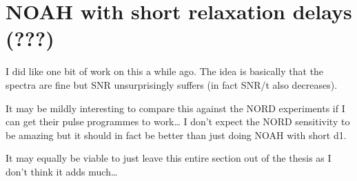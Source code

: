 \section{NOAH with short relaxation delays (???)}
\label{sec:noah__shortd1}

I did like one bit of work on this a while ago.
The idea is basically that the spectra are fine but SNR unsurprisingly suffers (in fact SNR/t also decreases).

It may be mildly interesting to compare this against the NORD experiments if I can get their pulse programmes to work\ldots{} I don't expect the NORD sensitivity to be amazing but it should in fact be better than just doing NOAH with short d1.

It may equally be viable to just leave this entire section out of the thesis as I don't think it adds much\ldots{}
